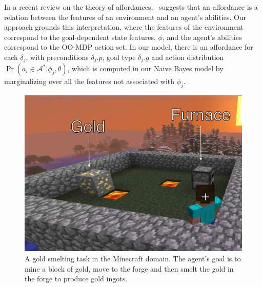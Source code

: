 \documentclass[letterpaper]{article}
\begin{document}
In a recent review on the theory of affordances,~\citet{chemero2003}
suggests that an affordance is a relation between the features of an
environment and an agent's abilities. Our approach grounds this
interpretation, where the features of the environment correspond to
the goal-dependent state features, $\phi$, and the agent's abilities
correspond to the OO-MDP action set. In our model, there is an
affordance for each $\delta_j$, with preconditions $\delta_j.p$, goal
type $\delta_j.g$ and action distribution $\Pr(a_i \in \mathcal{A}^* | \phi_j,
\theta)$, which is computed in our Naive Bayes model by marginalizing
over all the features not associated with $\phi_j$.


\begin{figure}
\centering
\includegraphics[scale=0.08]{figures/smelting_labeled.png}%
  \caption{A gold smelting task in the Minecraft domain.  The agent's
    goal is to mine a block of gold, move to the forge and then smelt
    the gold in the forge to produce gold ingots.}
  \label{fig:minecraft}
\end{figure}
\end{document}
